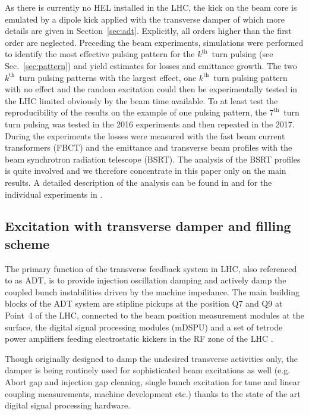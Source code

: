 \documentclass[%
 reprint,
 amsmath,amssymb,
 aps,
prstab,
]{revtex4-1}
\begin{document}
As there is currently no HEL installed in the LHC, the kick on the beam core is emulated by a dipole kick applied with the transverse damper of which more details are given in Section~\ref{sec:adt}. Explicitly, all orders higher than the first order are neglected. Preceding the beam experiments, simulations were performed to identify the most effective pulsing pattern for the $k^{\mathrm{th}}$~turn pulsing (see Sec.~\ref{sec:pattern}) and yield estimates for losses and emittance growth. The two $k^{\mathrm{th}}$~turn pulsing patterns with the largest effect, one $k^{\mathrm{th}}$~turn pulsing pattern with no effect and the random excitation could then be experimentally tested in the LHC limited obviously by the beam time available. To at least test the reproducibility of the results on the example of one pulsing pattern, the $7^{\mathrm{th}}$~turn turn pulsing was tested in the 2016 experiments and then repeated in the 2017. During the experiments the losses were measured with the fast beam current transformers (FBCT) and the emittance and transverse beam profiles with the beam synchrotron radiation telescope (BSRT). The analysis of the BSRT profiles is quite involved and we therefore concentrate in this paper only on the main results. A detailed description of the analysis can be found in \cite{bsrtprofinj} and for the individual experiments in \cite{resexmd2016,resexmd2017}.

\subsection{Excitation with transverse damper and filling scheme\label{sec:adt}}
The primary function of the transverse feedback system in LHC, also referenced to as ADT, is to provide injection oscillation damping and actively damp the coupled bunch instabilities driven by the machine impedance. The main building blocks of the ADT system are stipline pickups at the position Q7 and Q9 at Point~4 of the LHC, connected to the beam position measurement modules at the surface, the digital signal processing modules (mDSPU) and a set of tetrode power amplifiers feeding electrostatic kickers in the RF zone of the LHC \cite{adt_sum_2008,adt_sum_2011}.

Though originally designed to damp the undesired transverse activities only, the damper is being routinely used for sophisticated beam excitations as well (e.g. Abort gap and injection gap cleaning, single bunch excitation for tune and linear coupling measurements, machine development etc.) thanks to the state of the art digital signal processing hardware.
\end{document}
